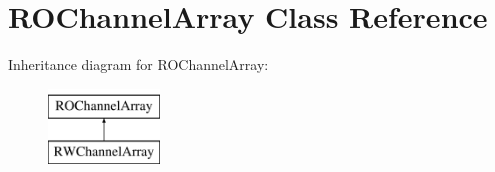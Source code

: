 \hypertarget{classROChannelArray}{}\section{R\+O\+Channel\+Array Class Reference}
\label{classROChannelArray}
Inheritance diagram for R\+O\+Channel\+Array\+:\begin{figure}[H]
\begin{center}
\leavevmode
\includegraphics[height=2.000000cm]{classROChannelArray}
\end{center}
\end{figure}

